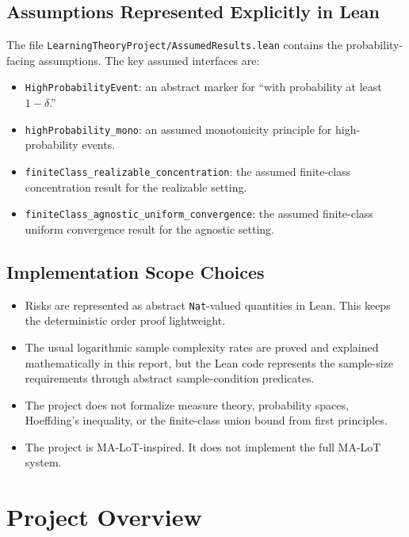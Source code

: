 \documentclass[11pt]{article}
\theoremstyle{definition}
\begin{document}
\subsection{Assumptions Represented Explicitly in Lean}

The file \texttt{LearningTheoryProject/AssumedResults.lean} contains the
probability-facing assumptions. The key assumed interfaces are:

\begin{itemize}[leftmargin=*]
  \item \texttt{HighProbabilityEvent}: an abstract marker for ``with probability
  at least $1-\delta$.''
  \item \texttt{highProbability\_mono}: an assumed monotonicity principle for
  high-probability events.
  \item \texttt{finiteClass\_realizable\_concentration}: the assumed
  finite-class concentration result for the realizable setting.
  \item \texttt{finiteClass\_agnostic\_uniform\_convergence}: the assumed
  finite-class uniform convergence result for the agnostic setting.
\end{itemize}

\subsection{Implementation Scope Choices}

\begin{itemize}[leftmargin=*]
  \item Risks are represented as abstract \texttt{Nat}-valued quantities in Lean.
  This keeps the deterministic order proof lightweight.
  \item The usual logarithmic sample complexity rates are proved and explained
  mathematically in this report, but the Lean code represents the sample-size
  requirements through abstract sample-condition predicates.
  \item The project does not formalize measure theory, probability spaces,
  Hoeffding's inequality, or the finite-class union bound from first principles.
  \item The project is MA-LoT-inspired. It does not implement the full MA-LoT
  system.
\end{itemize}

\section{Project Overview}
\end{document}
